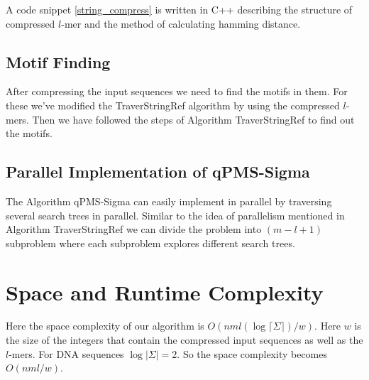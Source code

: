 {%

A code snippet \cref{string_compress} is written in C++ describing the structure of compressed $l$-mer and the method of calculating hamming distance.\\


\subsection{Motif Finding}
After compressing the input sequences we need to find the motifs in them. For these we've modified the TraverStringRef algorithm by using the compressed $l$-mers. Then we have followed the steps of Algorithm TraverStringRef  to find out the motifs.

\subsection{Parallel Implementation of qPMS-Sigma}
The Algorithm qPMS-Sigma can easily implement in parallel by traversing several search trees in parallel. Similar to the idea of parallelism mentioned in Algorithm TraverStringRef \cite{tanaka2014improved} we can divide the problem into $(m-l+1)$ subproblem where each subproblem explores different search trees.



\section{Space and Runtime Complexity}
Here the space complexity of our algorithm is $O(nml(\log \lceil \Sigma \rceil)/w)$. Here $w$ is the size of the integers that contain the compressed  input sequences as well as the $l$-mers. For DNA sequences $\log \lvert \Sigma \rvert = 2$. So the space complexity becomes $O(nml/w)$.\\

}
